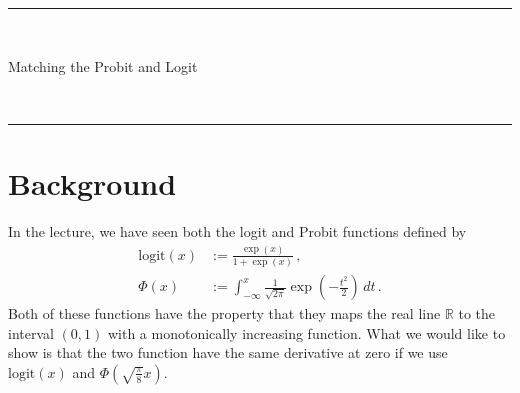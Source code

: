 \documentclass[a4paper]{article}
\begin{document}
\fancyhead[C]{}
\hrule \medskip
\begin{minipage}{0.295\textwidth}
    \raggedright
    \hfill\\
\end{minipage}
\begin{minipage}{0.4\textwidth}
    \centering
    \large
    Matching the Probit and Logit\\
\end{minipage}
\begin{minipage}{0.295\textwidth}
    \raggedleft
    \hfill\\
\end{minipage}
\medskip\hrule
\bigskip


\section*{Background}
In the lecture, we have seen both the logit and Probit functions defined by
\begin{align}
    \mathrm{logit}(x) & := \frac{\exp(x)}{1+\exp(x)} \,, \label{eq:logit} \\
    \Phi(x) & := \int_{-\infty}^x \frac{1}{\sqrt{2\pi}} \exp\left(-\frac{t^2}{2}\right)\, dt \label{eq:probit} \,. 
\end{align}
Both of these functions have the property that they maps the real line $\mathbb{R}$ to the interval $(0,1)$ with a monotonically increasing function. What we would like to show is that the two function have the same derivative at zero if we use $\mathrm{logit}(x)$ and $\Phi\left(\sqrt{\frac{\pi}{8}}x\right)$.
\end{document}

